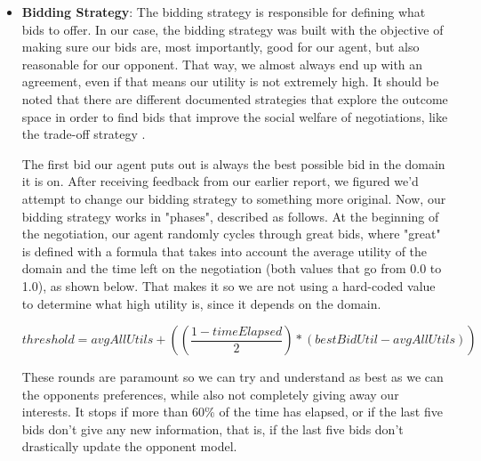 \documentclass{article}
\begin{document}
\begin{enumerate}
\begin{itemize}
\item \textbf{Bidding Strategy}: The bidding strategy is responsible for defining what bids to offer. In our case, the bidding strategy was built with the objective of making sure our bids are, most importantly, good for our agent, but also reasonable for our opponent. That way, we almost always end up with an agreement, even if that means our utility is not extremely high. It should be noted that there are different documented strategies that explore the outcome space in order to find bids that improve the social welfare of negotiations, like the trade-off strategy \cite{FARATIN2002205}.

The first bid our agent puts out is always the best possible bid in the domain it is on. After receiving feedback from our earlier report, we figured we'd attempt to change our bidding strategy to something more original. Now, our bidding strategy works in "phases", described as follows. At the beginning of the negotiation, our agent randomly cycles through great bids, where "great" is defined with a formula that takes into account the average utility of the domain and the time left on the negotiation (both values that go from 0.0 to 1.0), as shown below. That makes it so we are not using a hard-coded value to determine what high utility is, since it depends on the domain.

\[ threshold = avgAllUtils + ((\frac{1 - timeElapsed}{2}) * (bestBidUtil - avgAllUtils))\]

These rounds are paramount so we can try and understand as best as we can the opponents preferences, while also not completely giving away our interests. It stops if more than 60\% of the time has elapsed, or if the last five bids don't give any new information, that is, if the last five bids don't drastically update the opponent model. 


\end{itemize}
\end{enumerate}
\end{document}

